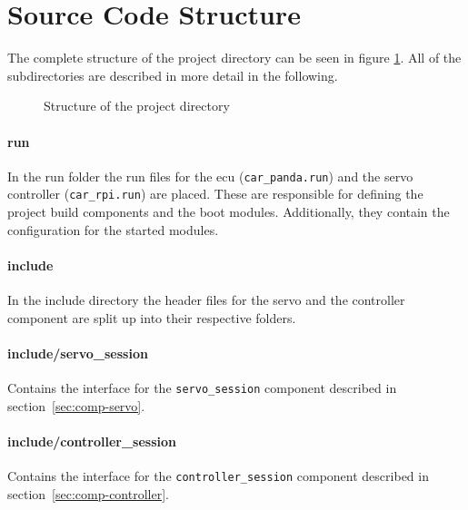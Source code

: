 \newpage

\section{Source Code Structure}
The complete structure of the project directory can be seen in figure \ref{fig:structure}. All of the subdirectories are described in more detail in the following. \\

\begin{figure}[h]
    \caption{Structure of the project directory}
    \label{fig:structure}
\end{figure}


\paragraph{run}
In the run folder the run files for the ecu (\texttt{car\_panda.run}) and the servo controller (\texttt{car\_rpi.run}) are placed.
These are responsible for defining the project build components and the boot modules. Additionally, they contain the configuration for the started modules.

\paragraph{include}
In the include directory the header files for the servo and the controller component are split up into their respective folders.

\paragraph{include/servo\_session}
Contains the interface for the \texttt{servo\_session} component described in section~\ref{sec:comp-servo}.

\paragraph{include/controller\_session}
Contains the interface for the \texttt{controller\_session} component described in section~\ref{sec:comp-controller}.


